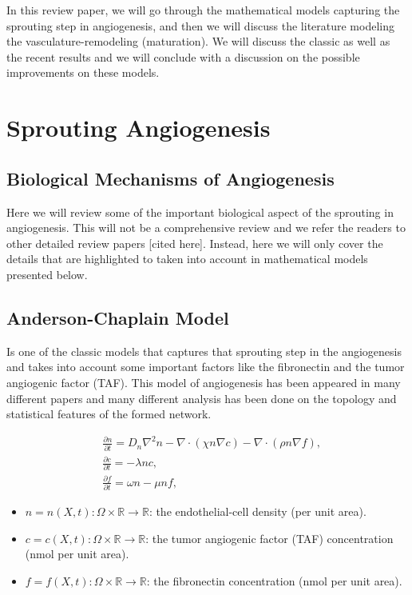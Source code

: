 \documentclass[10pt,a4paper,twocolumn]{article}
\newcommand{\R}{\mathbb{R}}
\begin{document}
	In this review paper, we will go through the mathematical models capturing the sprouting step in angiogenesis, and then we will discuss the literature modeling the vasculature-remodeling (maturation). We will discuss the classic as well as the recent results and we will conclude with a discussion on the possible improvements on these models.
	
	\section{Sprouting Angiogenesis}
	\subsection{Biological Mechanisms of Angiogenesis}
	Here we will review some of the important biological aspect of the sprouting in angiogenesis. This will not be a comprehensive review and we refer the readers to other detailed review papers [cited here]. Instead, here we will only cover the details that are highlighted to taken into account in mathematical models presented below.
	
	\subsection{Anderson-Chaplain Model}
	Is one of the classic models that captures that sprouting step in the angiogenesis and takes into account some important factors like the fibronectin and the tumor angiogenic factor (TAF). This model of angiogenesis has been appeared in many different papers and many different analysis has been done on the topology and statistical features of the formed network.
	
	\begin{align*}
		&\frac{\partial n}{\partial t} =  D_n\nabla^2 n  - \nabla\cdot(\chi n\nabla c) - \nabla\cdot(\rho n \nabla f), \\
		&\frac{\partial c}{\partial t} = -\lambda n c, \\
		&\frac{\partial f}{\partial t} = \omega n - \mu n f,
	\end{align*}
	
	\begin{itemize}
		\item $ n = n(X,t): \Omega \times \R \to \R $: the endothelial-cell density (per unit area).
		\item $ c = c(X,t): \Omega \times \R \to \R $: the tumor angiogenic factor (TAF) concentration (nmol per unit area).
		\item $ f = f(X,t): \Omega \times \R \to \R $: the fibronectin concentration (nmol per unit area).
	\end{itemize}
	
\end{document}
